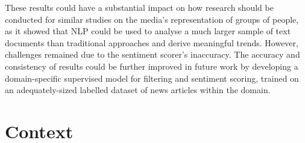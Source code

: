 \documentclass{report}
\begin{document}
These results could have a substantial impact on how research should be conducted for similar studies on the media's representation of groups of people, as it showed that NLP could be used to analyse a much larger sample of text documents than traditional approaches and derive meaningful trends.
However, challenges remained due to the sentiment scorer's inaccuracy.
The accuracy and consistency of results could be further improved in future work by developing a domain-specific supervised model for filtering and sentiment scoring, trained on an adequately-sized labelled dataset of news articles within the domain.   



\chapter{Context} \label{Context} %







\end{document}
